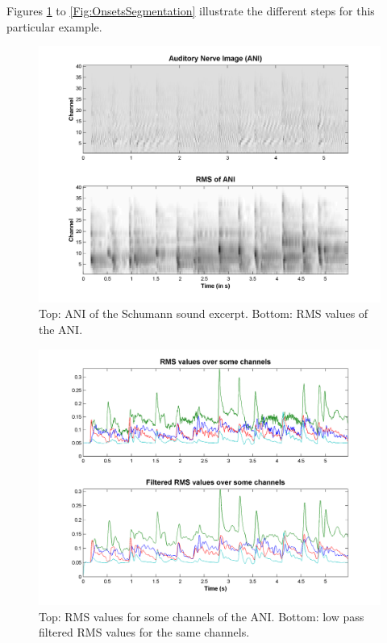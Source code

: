 Figures \ref{Fig:OnsetsANIAndRMS} to \ref{Fig:OnsetsSegmentation}
illustrate the different steps for this particular example.

\begin{figure}[h]
    \centering
    \includegraphics[width=\IPEMDefaultFigureWidth]{Graphics/OnsetsANIAndRMS}
    \caption{Top: ANI of the Schumann sound excerpt. Bottom: RMS values of the ANI.}
    \label{Fig:OnsetsANIAndRMS}
\end{figure}

\begin{figure}[h]
    \centering
    \includegraphics[width=\IPEMDefaultFigureWidth]{Graphics/OnsetsFilteredRMS}
    \caption{Top: RMS values for some channels of the ANI. Bottom: low pass filtered RMS values for the same channels.}
    \label{Fig:OnsetsFilteredRMS}
\end{figure}

